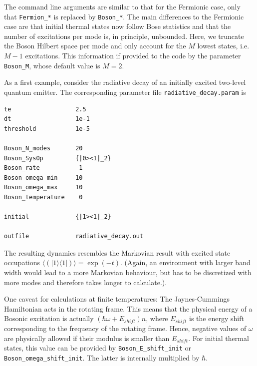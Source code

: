\documentclass{scrartcl}
\begin{document}
The command line arguments are similar to that for the Fermionic case, only 
that \verb+Fermion_*+ is replaced by \verb+Boson_*+.
The main differences to the Fermionic case are that initial thermal states 
now follow Bose statistics and that the number of 
excitations per mode is, in principle, unbounded. Here, we truncate the
Boson Hilbert space per mode and only account for the $M$ lowest states,
i.e. $M-1$ excitations. This information if provided to the code by the
parameter \verb+Boson_M+, whose default value is $M=2$. 

As a first example, consider the radiative decay of an initially excited
two-level quantum emitter. The corresponding parameter file 
\verb+radiative_decay.param+ is


\noindent\makebox[5cm]{\rule{7cm}{0.4pt}}
\begin{verbatim}
te                  2.5
dt                  1e-1
threshold           1e-5

Boson_N_modes       20
Boson_SysOp         {|0><1|_2}
Boson_rate           1 
Boson_omega_min    -10 
Boson_omega_max     10
Boson_temperature    0

initial             {|1><1|_2}

outfile             radiative_decay.out
\end{verbatim}
\noindent\makebox[5cm]{\rule{7cm}{0.4pt}}

The resulting dynamics resembles the Markovian result with excited state
occupations
$\langle (|1\rangle\langle 1|) \rangle= \exp(-t)$. 
(Again, an environment with larger band width would lead to a more Markovian 
behaviour, but has to be discretized with more modes and therefore takes
longer to calculate.).

One caveat for calculations at finite temperatures: The Jaynes-Cummings 
Hamiltonian acts in the rotating frame. This means that the physical energy 
of a Bosonic excitation is actually $(\hbar\omega + E_{shift}) n $, where 
$E_{shift}$ is the energy shift corresponding to the frequency of 
the rotating frame. Hence, negative values of $\omega$ are physically allowed 
if their modulus is smaller than $E_{shift}$. For initial thermal states, 
this value can be provided by \verb+Boson_E_shift_init+ or 
\verb+Boson_omega_shift_init+. The latter is internally multiplied by $\hbar$.
\end{document}

